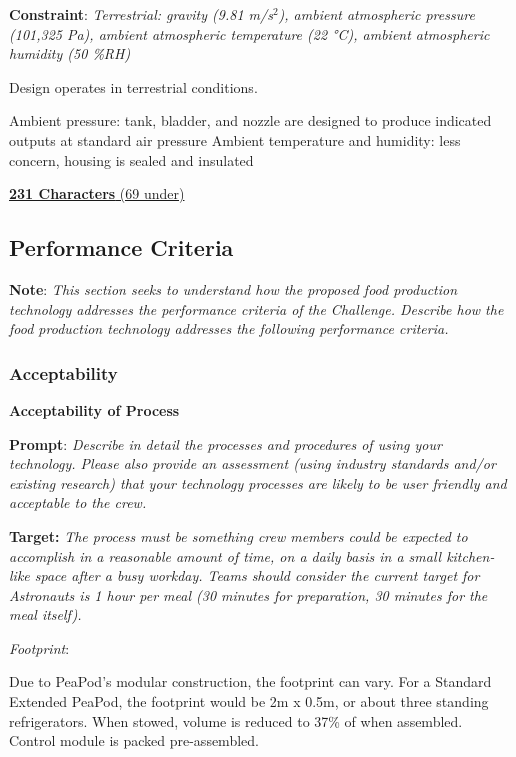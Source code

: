 \documentclass{report}
\begin{document}
\textbf{Constraint}: \textit{Terrestrial: gravity (9.81 m/s${}^2$), ambient atmospheric pressure (101,325 Pa), ambient atmospheric temperature (22 °C), ambient atmospheric humidity (50 \%RH)}

Design operates in terrestrial conditions.

Ambient pressure: tank, bladder, and nozzle are designed to produce indicated outputs at standard air pressure
Ambient temperature and humidity: less concern, housing is sealed and insulated

\uline{\textbf{231 Characters} (69 under)}

\newpage

\subsection{Performance Criteria}

\textbf{Note}: \textit{This section seeks to understand how the proposed food production technology addresses the performance criteria of the Challenge. Describe how the food production technology addresses the following performance criteria.}

\subsubsection{Acceptability}
\label{sec:acceptability}

\textbf{Acceptability of Process}
\label{sec:acceptability-process}

\textbf{Prompt}: \textit{Describe in detail the processes and procedures of using your technology. Please also provide an assessment (using industry standards and/or existing research) that your technology processes are likely to be user friendly and acceptable to the crew.}

\textbf{Target:} \textit{The process must be something crew members could be expected to accomplish in a reasonable amount of time, on a daily basis in a small kitchen-like space after a busy workday. Teams should consider the current target for Astronauts is 1 hour per meal (30 minutes for preparation, 30 minutes for the meal itself).}


\textit{Footprint}:

Due to PeaPod's modular construction, the footprint can vary. For a Standard Extended PeaPod, the footprint would be 2m x 0.5m, or about three standing refrigerators. When stowed, volume is reduced to 37\% of when assembled. Control module is packed pre-assembled.
\end{document}

